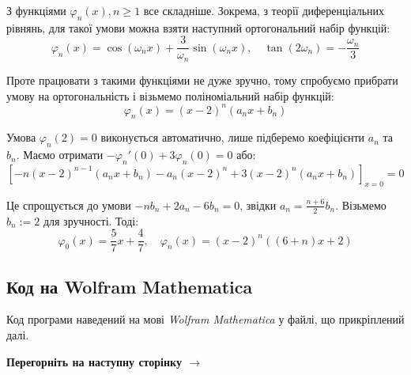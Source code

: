 \documentclass[14pt]{extarticle}
\begin{document}
З функціями $\varphi_n(x), n \geq 1$ все складніше. Зокрема, з теорії 
диференціальних рівнянь, для такої умови можна взяти наступний 
ортогональний набір функцій:
\begin{equation*}
    \varphi_n(x) = \cos(\omega_n x) + \frac{3}{\omega_n}\sin(\omega_n x), \quad \tan (2\omega_n) = -\frac{\omega_n}{3}
\end{equation*}

Проте працювати з такими функціями не дуже зручно, тому спробуємо прибрати 
умову на ортогональність і візьмемо поліноміальний набір функцій:
\begin{equation*}
    \varphi_n(x) = (x-2)^n(a_nx+b_n)
\end{equation*}

Умова $\varphi_n(2) = 0$ виконується автоматично, лише підберемо 
коефіцієнти $a_n$ та $b_n$. Маємо отримати $-\varphi_n'(0) + 3\varphi_n(0) = 0$ або:
\begin{equation*}
    \left[-n(x-2)^{n-1}(a_nx+b_n) - a_n(x-2)^n + 3(x-2)^n(a_nx+b_n)\right]_{x=0} = 0
\end{equation*} 

Це спрощується до умови $-nb_n + 2a_n - 6b_n = 0$, звідки $a_n =
\frac{n+6}{2}b_n$. Візьмемо $b_n := 2$ для зручності. Тоді:
\begin{equation*}
    \varphi_0(x) = \frac{5}{7}x + \frac{4}{7}, \quad \varphi_n(x) = (x-2)^n\left(\left(6+n\right)x+2\right)
\end{equation*}

\subsection{Код на Wolfram Mathematica}

Код програми наведений на мові \textit{Wolfram Mathematica} у файлі, 
що прикріплений далі. 

\begin{center}
    \textbf{Перегорніть на наступну сторінку $\to$}
\end{center}

\end{document}
